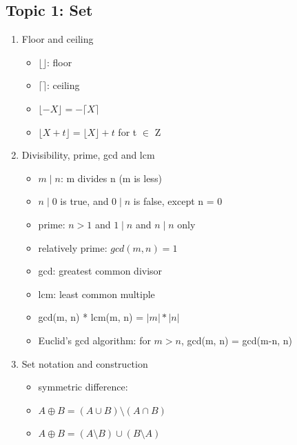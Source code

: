 \documentclass[11pt, a4paper]{article}
\begin{document}
\begin{multicols}{3}
\graphicspath{{/}}

\section*{Topic 1: Set}
\begin{enumerate}
    \item Floor and ceiling
        \begin{itemize}
            \item $\lfloor \rfloor$: floor
            \item $\lceil \rceil$: ceiling
            \item $\lfloor -X \rfloor = - \lceil X \rceil$
            \item $\lfloor X + t \rfloor = \lfloor X \rfloor + t$ for t $\in$ Z
        \end{itemize}
    \item Divisibility, prime, gcd and lcm
        \begin{itemize}
            \item $m \mid n$: m divides n (m is less)
            \item $n \mid 0$ is true, and $0 \mid n$ is false, except n = 0
            \item prime: $n > 1$ and $1 \mid n$ and $n \mid n$ only
            \item relatively prime: $gcd(m, n) = 1$
            \item gcd: greatest common divisor
            \item lcm: least common multiple
            \item gcd(m, n) * lcm(m, n) = $|m| * |n|$
            \item Euclid's gcd algorithm: for $m > n$, gcd(m, n) = gcd(m-n, n)
        \end{itemize}
    \item Set notation and construction
        \begin{itemize}
            \item symmetric difference:
            \item $A \oplus B = (A \cup B) \setminus (A \cap B)$
            \item $A \oplus B = (A \setminus B) \cup (B \setminus A)$

\end{itemize}
\end{enumerate}
\end{multicols}
\end{document}
